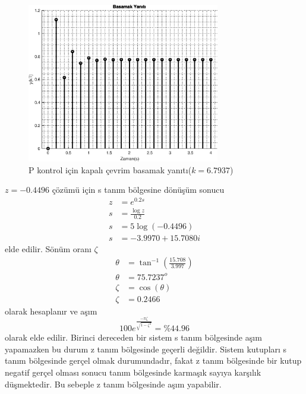 \begin{figure}[!htb]
    \centering
    \includegraphics[width=0.75\textwidth]{img/lec7_step2}
    \caption{P kontrol için kapalı çevrim basamak yanıtı($k=6.7937$)}
    \label{fig:lec7_step2}
\end{figure}

$z=-0.4496$ çözümü için s tanım bölgesine dönüşüm sonucu
\begin{equation}
\begin{split}
    z&=e^{0.2s}\\
    s&=\frac{\log{z}}{0.2}\\
    s&=5\log{(-0.4496)}\\
    s&=-3.9970 +15.7080i
\end{split}
\end{equation}
elde edilir. Sönüm oranı $\zeta$
\begin{equation}
    \begin{split}
        \theta&=\tan^{-1}\left(\frac{15.708}{3.997}\right)\\
        \theta&=75.7237^o\\
        \zeta&=\cos(\theta)\\
        \zeta&=0.2466
    \end{split}
\end{equation}
olarak hesaplanır ve aşım
\begin{equation}
        100e^{\frac{-\pi \zeta}{\sqrt{1-\zeta^2}}}=\%44.96
\end{equation}
olarak elde edilir. Birinci dereceden bir sistem s tanım bölgesinde aşım yapamazken bu durum z tanım bölgesinde geçerli değildir. Sistem kutupları s tanım bölgesinde gerçel olmak durumundadır, fakat z tanım bölgesinde bir kutup negatif gerçel olması sonucu tanım bölgesinde karmaşık sayıya karşılık düşmektedir. Bu sebeple z tanım bölgesinde aşım yapabilir. 
